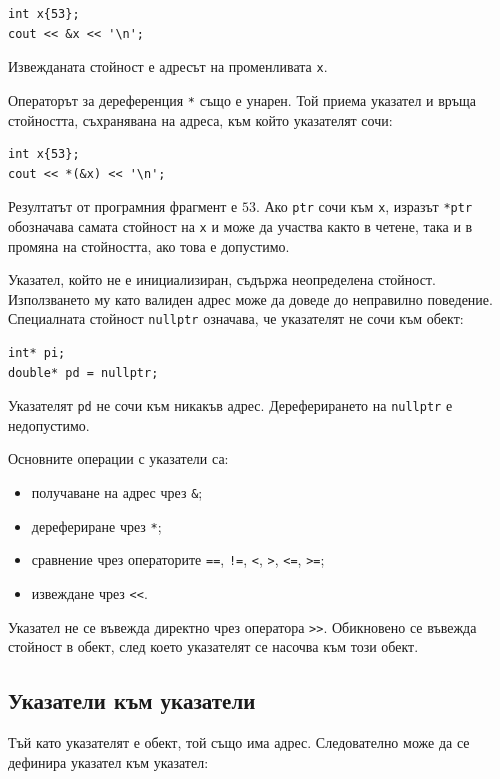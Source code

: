 \begin{verbatim}
int x{53};
cout << &x << '\n';
\end{verbatim}

Извежданата стойност е адресът на променливата \texttt{x}.

Операторът за дереференция \texttt{*} също е унарен. Той приема указател и връща стойността, съхранявана на адреса, към който указателят сочи:

\begin{verbatim}
int x{53};
cout << *(&x) << '\n';
\end{verbatim}

Резултатът от програмния фрагмент е $53$. Ако \texttt{ptr} сочи към \texttt{x}, изразът \texttt{*ptr} обозначава самата стойност на \texttt{x} и може да участва както в четене, така и в промяна на стойността, ако това е допустимо.

Указател, който не е инициализиран, съдържа неопределена стойност. Използването му като валиден адрес може да доведе до неправилно поведение. Специалната стойност \texttt{nullptr} означава, че указателят не сочи към обект:

\begin{verbatim}
int* pi;
double* pd = nullptr;
\end{verbatim}

Указателят \texttt{pd} не сочи към никакъв адрес. Дереферирането на \texttt{nullptr} е недопустимо.

Основните операции с указатели са:

\begin{itemize}
\item получаване на адрес чрез \texttt{\&};
\item дерефериране чрез \texttt{*};
\item сравнение чрез операторите \texttt{==}, \texttt{!=}, \texttt{<}, \texttt{>}, \texttt{<=}, \texttt{>=};
\item извеждане чрез \texttt{<<}.
\end{itemize}

Указател не се въвежда директно чрез оператора \texttt{>>}. Обикновено се въвежда стойност в обект, след което указателят се насочва към този обект.

\subsection{Указатели към указатели}\label{s:15.1.2}

Тъй като указателят е обект, той също има адрес. Следователно може да се дефинира указател към указател:

